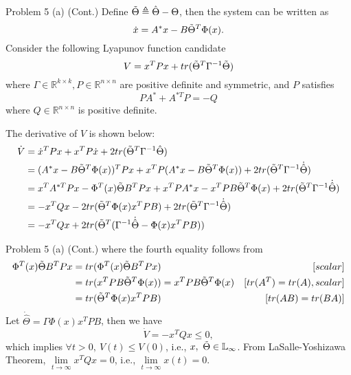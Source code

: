 \documentclass[8pt]{beamer}
\begin{document}
\begin{frame}[t]{Problem 5 (a) (Cont.)}
  Define $\Tilde{\Theta} \triangleq \hat{\Theta} - \Theta$, then the system can be written as 
  \begin{equation*}
    \dot x = A^*x-B\Tilde{\Theta}^T\Phi(x).
\end{equation*}
Consider the following Lyapunov function candidate
\begin{equation*}
    V=x^TPx+tr(\Tilde{\Theta}^T\Gamma^{-1}\Tilde{\Theta})
\end{equation*}
where $\Gamma\in \mathbb{R}^{k \times k},P\in \mathbb{R}^{n \times n}$ are positive definite and symmetric,
and $P$ satisfies
\begin{equation*}
    PA^*+A^{*T}P=-Q
\end{equation*}
where $Q\in\mathbb{R}^{n \times n}$ is positive definite.

The derivative of $V$ is shown below:
\begin{align*}
    \dot V &= \dot x^TPx+x^TP\dot x+2tr(\Tilde{\Theta}^T\Gamma^{-1}\hat{\Theta}) \\
    &=(A^*x-B\Tilde{\Theta}^T\Phi(x))^TPx+x^TP(A^*x-B\Tilde{\Theta}^T\Phi(x))+2tr(\Tilde{\Theta}^T\Gamma^{-1}\dot{\hat{\Theta}}) \\
    &=x^TA^{*T}Px-\Phi^T(x)\Tilde{\Theta}B^TPx+x^TPA^*x-x^TPB\Tilde{\Theta}^T\Phi(x)+2tr(\Tilde{\Theta}^T\Gamma^{-1}\dot{\hat{\Theta}}) \\
    &=-x^TQx-2tr(\Tilde{\Theta}^T\Phi(x)x^TPB)+2tr(\Tilde{\Theta}^T\Gamma^{-1}\dot{\hat{\Theta}})\\
    &=-x^TQx+2tr(\Tilde{\Theta}^T(\Gamma^{-1}\dot{\hat{\Theta}}-\Phi(x)x^TPB))
\end{align*}
\end{frame}

\begin{frame}[t]{Problem 5 (a) (Cont.)}
  where the fourth equality follows from
\begin{align*}
  \Phi^T(x)\Tilde{\Theta}B^TPx &= tr(\Phi^T(x)\Tilde{\Theta}B^TPx) &[scalar]\\
  &=tr(x^TPB\Tilde{\Theta}^T\Phi(x))=x^TPB\Tilde{\Theta}^T\Phi(x)&[tr(A^T)=tr(A),scalar]\\
  &=tr(\Tilde{\Theta}^T\Phi(x)x^TPB)&[tr(AB)=tr(BA)]
\end{align*}
  Let $\dot{\hat{\Theta}}=\Gamma\Phi(x)x^TPB$, then we have \[\dot V = -x^TQx \le 0,\] which implies $\forall t >0,\ V(t) \le V(0)$, i.e., $x, \ \Tilde{\Theta} \in \mathbb{L}_{\infty}$. From LaSalle-Yoshizawa Theorem, $\lim\limits_{t\to\infty}x^TQx=0$, i.e., $\lim\limits_{t\to\infty}x(t)=0$.
\end{frame}
\end{document}
